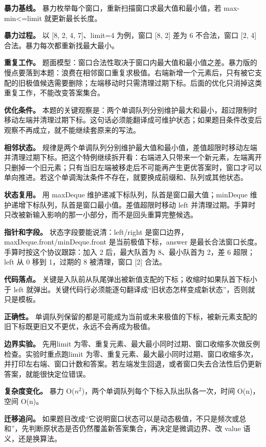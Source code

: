 \textbf{暴力基线。} 暴力枚举每个窗口，重新扫描窗口求最大值和最小值，若 max-min<=limit 就更新最长长度。

\textbf{暴力过程。} 以 [8, 2, 4, 7]、limit=4 为例，窗口 [8, 2] 差为 6 不合法，窗口 [2, 4] 合法。暴力每次都重新找最大最小。

\textbf{重复工作。} 题面模型：窗口合法性取决于窗口内最大值和最小值之差。暴力版的慢点要落到本题：浪费在相邻窗口重复求极值。右端新增一个元素后，只有被它支配的旧极值候选需要删除；左端移动时只需清理过期下标。后面的优化只消掉这类重复工作，不能改变答案集合。

\textbf{优化条件。} 本题的关键观察是：两个单调队列分别维护最大和最小，超过限制时移动左端并清理过期下标。这句话必须能翻译成可维护状态；如果题目条件改变后观察不再成立，就不能继续套原来的写法。

\textbf{相邻状态。} 规律是两个单调队列分别维护最大值和最小值，差值超限时移动左端并清理过期下标。把这个特例继续拆开看：右端进入只带来一个新元素，左端离开只删掉一个旧元素；只有当旧左端被移走后不可能再产生更优答案时，窗口才可以单向推进。若这个单调淘汰条件不存在，就要换成前缀和、队列或其他状态。

\textbf{状态复用。} 用 maxDeque 维护递减下标队列，队首是窗口最大值；minDeque 维护递增下标队列，队首是窗口最小值。差值超限时移动 left 并清理过期。手算时只改被新输入影响的那一小部分，而不是回头重算完整候选。

\textbf{指针和字段。} 状态字段要能说清：left/right 是窗口边界，maxDeque.front/minDeque.front 是当前极值下标，answer 是最长合法窗口长度。手算时按这个协议跟踪：加入 2 后，最大队首为 8、最小队首为 2，差 6 超限；left 从 0 移到 1，过期的 8 被清理，窗口 [2] 合法。

\textbf{代码落点。} 关键是入队前从队尾弹出被新值支配的下标；收缩时如果队首下标小于 left 就弹出。关键代码行必须能逐句翻译成“旧状态怎样变成新状态”，否则就只是模板。

\textbf{正确性。} 单调队列保留的都是可能成为当前或未来极值的下标，被新元素支配的旧下标既更旧又不更优，永远不会再成为极值。

\textbf{边界实验。} 先用limit 为零、重复元素、最大最小同时过期、窗口收缩多次做反例检查。实验时重点跑limit 为零、重复元素、最大最小同时过期、窗口收缩多次，并打印左右端、窗口计数和答案。若左端发生回退，或者窗口失去合法性后仍更新答案，就能很快定位错误。

\textbf{复杂度变化。} 暴力 O(\ensuremath{n^{2}})，两个单调队列每个下标入队出队各一次，时间 O(n)，空间 O(n)。

\textbf{迁移追问。} 如果题目改成“它说明窗口状态可以是动态极值，不只是频次或总和”，先判断原状态是否仍然覆盖新答案集合，再决定是微调边界、改 value 语义，还是换算法。

